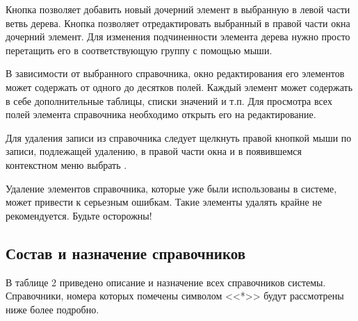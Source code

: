 Кнопка   позволяет добавить новый дочерний элемент в выбранную в левой части ветвь дерева. Кнопка   позволяет отредактировать выбранный в правой части окна дочерний элемент. Для изменения подчиненности элемента дерева нужно просто перетащить его в соответствующую группу с помощью мыши.

В зависимости от выбранного справочника, окно редактирования его элементов может содержать от одного до десятков полей. Каждый элемент может содержать в себе дополнительные таблицы, списки значений и т.п. Для просмотра всех полей элемента справочника необходимо открыть его на редактирование.

Для удаления записи из справочника следует щелкнуть правой кнопкой мыши по записи, подлежащей удалению, в правой части окна и в появившемся контекстном меню выбрать .

\begin{vnim}
 Удаление элементов справочника, которые уже были использованы в системе, может привести к серьезным ошибкам. Такие элементы удалять крайне не рекомендуется. Будьте осторожны!
\end{vnim}

\subsection{Состав и назначение справочников \tmis}

В таблице 2 приведено описание и назначение всех справочников системы. Справочники, номера которых помечены символом <<*>> будут рассмотрены ниже более подробно.


